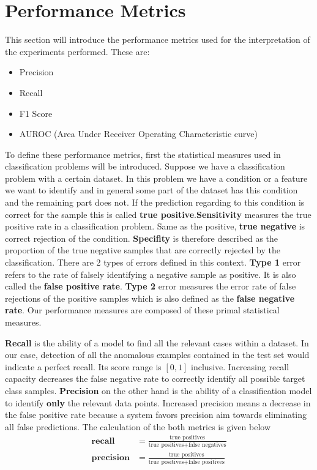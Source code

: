 \section{Performance Metrics}
\label{sec:perf_metric}
This section will introduce the performance metrics used for the interpretation of the experiments performed.
These are:
\begin{itemize}
	\item Precision
	\item Recall
	\item F1 Score
	\item AUROC (Area Under Receiver Operating Characteristic curve)
\end{itemize}

To define these performance metrics, first the statistical measures used in  classification problems  
will be introduced. Suppose we have a classification problem with a certain dataset. In this problem we 
have a condition or a feature we want to identify and in general some part of the dataset has 
this condition and the remaining part does not. If the prediction regarding to this condition is correct 
for the sample this is called \textbf{true positive}.\textbf{Sensitivity} measures the true positive rate in a 
classification problem. Same as the positive, \textbf{true negative} is correct rejection of the condition. 
\textbf{Specifity} is therefore described as the proportion of the true negative samples that are correctly 
rejected by the classification. There are 2 types of errors defined in this context. \textbf{Type 1} 
error refers to the rate of falsely identifying a negative sample as positive. It is also called the 
\textbf{false positive rate}. \textbf{Type 2} error measures the error rate of false rejections of the 
positive samples which is also defined as the \textbf{false negative rate}. Our performance measures are 
composed of these primal statistical measures. 

\textbf{Recall} is the ability of a model to find all the relevant cases within a dataset. In our case, 
detection of all the anomalous examples contained in the test set would indicate a perfect recall. Its 
score range is $[0,1]$ inclusive. Increasing recall capacity decreases the false negative rate to 
correctly identify all possible target class samples. \textbf{Precision} on the other hand is the 
ability of a classification model to identify \textbf{only} the relevant data points. Increased precision 
means a decrease in the false positive rate because a system favors precision aim towards eliminating all 
false predictions. The calculation of the both metrics is given below
\begin{align}
\textbf{recall} & = \frac{\text{true positives}}{\text{true positives} + \text{false negatives}} \\[5pt]
\textbf{precision} & = \frac{\text{true positives}}{\text{true positives} + \text{false positives}}
\end{align}

